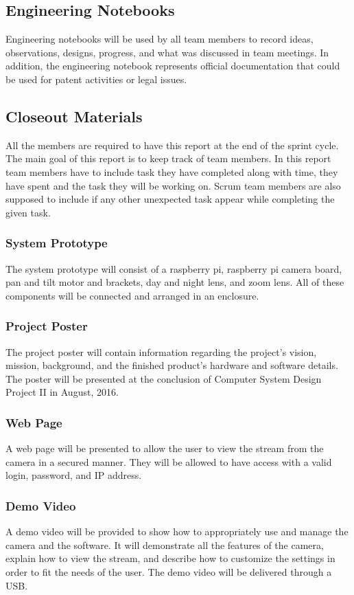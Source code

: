 \subsection{Engineering Notebooks}
Engineering notebooks will be used by all team members to record ideas, observations, designs, progress, and what was discussed in team meetings. In addition, the engineering notebook represents official documentation that could be used for patent activities or legal issues. 

\subsection{Closeout Materials}
All the members are required to have this report at the end of the sprint cycle. The main goal of this report is to keep track of team members. In this report team members have to include task they have completed along with time, they have spent and the task they will be working on. Scrum team members are also supposed to include if any other unexpected task appear while completing the given task.

\subsubsection{System Prototype}
The system prototype will consist of a raspberry pi, raspberry pi camera board, pan and tilt motor and brackets, day and night lens, and zoom lens. All of these components will be connected and arranged in an enclosure. 

\subsubsection{Project Poster}
The project poster will contain information regarding the project’s vision, mission, background, and the finished product’s hardware and software details. The poster will be presented at the conclusion of Computer System Design Project II in August, 2016. 

\subsubsection{Web Page}
A web page will be presented to allow the user to view the stream from the camera in a secured manner. They will be allowed to have access with a valid login, password, and IP address. 

\subsubsection{Demo Video}
A demo video will be provided to show how to appropriately use and manage the camera and the software. It will demonstrate all the features of the camera, explain how to view the stream, and describe how to customize the settings in order to fit the needs of the user. The demo video will be delivered through a USB. 

